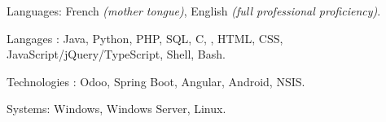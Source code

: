 \begin{indentsection}{\parindent}
\begin{description*}
  \item[Languages:]
  French \emph{(mother tongue)}, English \emph{(full professional proficiency)}.
 \item[Langages :] Java, Python, PHP, SQL, C, \Csharp, HTML,
  CSS, JavaScript/jQuery/TypeScript, Shell, Bash.
  \item[Technologies :] Odoo, Spring Boot, Angular, Android, NSIS.
  \item[Systems:] Windows, Windows Server, Linux.
\end{description*}
\end{indentsection}
